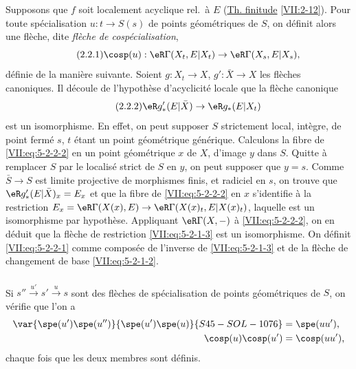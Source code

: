 Supposons que $f$ soit localement acyclique rel.\ à $E$ (\hyperref[VII]{Th. finitude} \ref{VII:2-12}). 
Pour toute spécialisation $u:t\to S(s)$ de points géométriques de $S$, on 
définit alors une flèche, dite \emph{flèche de cospécialisation}, 
\begin{equation*}\tag{2.2.1}\label{VII:eq:5-2-2-1}
  \cosp(u):\eR\Gamma(X_t,E|X_t) \to \eR\Gamma(X_s,E|X_s) \text{,} 
\end{equation*}
définie de la manière suivante. Soient $g:X_t\to X$, $g':\bar X\to X$ les 
flèches canoniques. Il découle de l'hypothèse d'acyclicité locale que 
la flèche canonique 
\begin{equation*}\tag{2.2.2}\label{VII:eq:5-2-2-2}
  \eR g_\ast'(E|\bar X)\to \eR g_\ast(E|X_t) 
\end{equation*}
est un isomorphisme. En effet, on peut supposer $S$ strictement local, 
intègre, de point fermé $s$, $t$ étant un point géométrique 
générique. Calculons la fibre de \eqref{VII:eq:5-2-2-2} en un point 
géométrique $x$ de $X$, d'image $y$ dans $S$. Quitte à remplacer $S$ par 
le localisé strict de $S$ en $y$, on peut supposer que $y=s$. Comme 
$\bar S\to S$ est limite projective de morphismes finis, et radiciel en $s$, on 
trouve que $\eR g_\ast'(E|\bar X)_x = E_x$ et que la fibre de 
\eqref{VII:eq:5-2-2-2} en $x$ s'identifie à la restriction 
$E_x=\eR\Gamma(X(x),E)\to \eR\Gamma(X(x)_t,E|X(x)_t)$, laquelle est un 
isomorphisme par hypothèse. Appliquant $\eR\Gamma(X,-)$ à 
\eqref{VII:eq:5-2-2-2}, on en déduit que la flèche de restriction 
\eqref{VII:eq:5-2-1-3} est un isomorphisme. On définit \eqref{VII:eq:5-2-2-1} 
comme composée de l'inverse de \eqref{VII:eq:5-2-1-3} et de la flèche de 
changement de base \eqref{VII:eq:5-2-1-2}. 





\subsubsection{}\label{VII:5-2-3}

Si $s'' \xrightarrow{u'} s' \xrightarrow u s$ sont des flèches de 
spécialisation de points géométriques de $S$, on vérifie que l'on a 
\begin{align*}
  \var{\spe(u')\spe(u'')}{\spe(u')\spe(u)}{S45-SOL-1076} &= \spe(u u') \text{,} \\
  \cosp(u) \cosp(u') &= \cosp(u u') \text{,} 
\end{align*}
chaque fois que les deux membres sont définis. 





